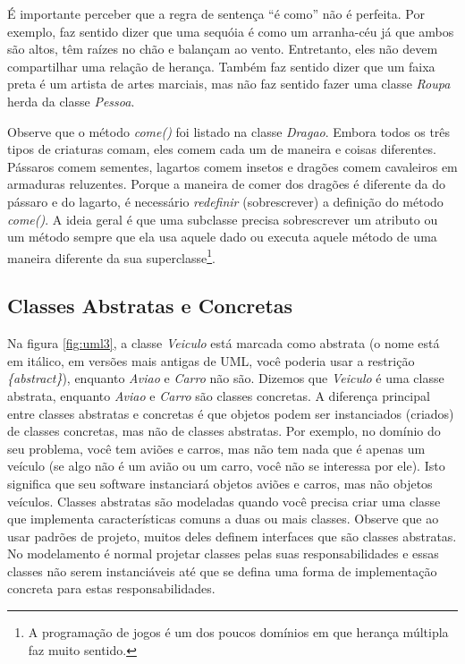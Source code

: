 É importante perceber que a regra de sentença ``é como'' não é perfeita. Por exemplo, faz sentido dizer que uma sequóia é como um arranha-céu já que ambos são altos, têm raízes no chão e balançam ao vento. Entretanto, eles não devem compartilhar uma relação de herança. Também faz sentido dizer que um faixa preta é um artista de artes marciais, mas não faz sentido fazer uma classe \emph{Roupa} herda da classe \emph{Pessoa}.

Observe que o método \emph{come()} foi listado na classe \emph{Dragao}. Embora todos os três tipos de criaturas comam, eles comem cada um de maneira e coisas diferentes. Pássaros comem sementes, lagartos comem insetos e dragões comem cavaleiros em armaduras reluzentes. Porque a maneira de comer dos dragões é diferente da do pássaro e do lagarto, é necessário \textit{redefinir} (sobrescrever) a definição do método \emph{come()}. A ideia geral é que uma subclasse precisa sobrescrever um atributo ou um método sempre que ela usa aquele dado ou executa aquele método de uma maneira diferente da sua superclasse\footnote{A programação de jogos é um dos poucos domínios em que herança múltipla faz muito sentido.}.

\subsection{Classes Abstratas e Concretas}

Na figura \ref{fig:uml3}, a classe \emph{Veiculo} está marcada como abstrata (o nome está em itálico, em versões mais antigas de UML, você poderia usar a restrição \emph{\{abstract\}}), enquanto \emph{Aviao} e \emph{Carro} não são. Dizemos que 
\emph{Veiculo} é uma classe abstrata, enquanto \emph{Aviao} e \emph{Carro} são classes concretas. A diferença principal entre classes abstratas e concretas é que objetos podem ser instanciados (criados) de classes concretas, mas não de classes abstratas. Por exemplo, no domínio do seu problema, você tem aviões e carros, mas não tem nada que é apenas um veículo (se algo não é um avião ou um carro, você não se interessa por ele). Isto significa que seu software instanciará objetos aviões e carros, mas não objetos veículos. Classes abstratas são modeladas quando você precisa criar uma classe que implementa características comuns a duas ou mais classes. Observe que ao usar padrões de projeto, muitos deles definem interfaces que são classes abstratas. No modelamento é normal projetar classes pelas suas responsabilidades e essas classes não serem instanciáveis até que se defina uma forma de implementação concreta para estas responsabilidades.

